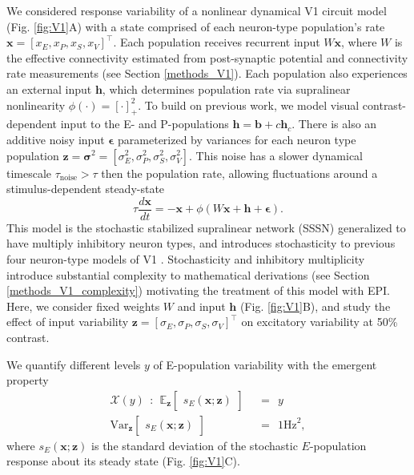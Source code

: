 \documentclass[11pt]{article}
\begin{document}
We considered response variability of a nonlinear dynamical V1 circuit model (Fig. \ref{fig:V1}A) with a state comprised of each neuron-type population's rate $\mathbf{x} = \left[x_E, x_P , x_S, x_V \right]^\top$.
Each population receives recurrent input $W \mathbf{x}$, where $W$ is the effective connectivity estimated from post-synaptic potential and connectivity rate measurements (see Section \ref{methods_V1}).
Each population also experiences an external input $\mathbf{h}$, which determines population rate via supralinear nonlinearity $\phi(\cdot) = \left[\cdot \right]^2_+$.
To build on previous work, we model visual contrast-dependent input to the E- and P-populations $\mathbf{h} = \mathbf{b} + c\mathbf{h}_c$.
There is also an additive noisy input $\bm{\epsilon}$ parameterized by variances for each neuron type population $\mathbf{z} = \bm{\sigma}^2 = \left[ \sigma_E^2, \sigma_P^2, \sigma_S^2, \sigma_V^2\right]$.
This noise has a slower dynamical timescale $\tau_{\text{noise}} > \tau$ then the population rate, allowing fluctuations around a stimulus-dependent steady-state
\begin{equation}
    \tau \frac{d\mathbf{x}}{dt} = -\mathbf{x} +\phi(W\mathbf{x} + \mathbf{h} + \bm{\epsilon}).
\end{equation}
This model is the stochastic stabilized supralinear network (SSSN) \cite{hennequin2018dynamical} generalized to have multiply inhibitory neuron types, and introduces stochasticity to previous four neuron-type models of V1 \cite{litwin2016inhibitory}.
Stochasticity and inhibitory multiplicity introduce substantial complexity to mathematical derivations (see Section \ref{methods_V1_complexity}) motivating the treatment of this model with EPI.
Here, we consider fixed weights $W$ and input $\mathbf{h}$ \cite{palmigiano2020structure} (Fig. \ref{fig:V1}B), and study the effect of input variability $\mathbf{z} = [\sigma_E, \sigma_P, \sigma_S, \sigma_V]^\top$ on excitatory variability at 50\% contrast. 

We quantify different levels $y$ of E-population variability with the emergent property
\begin{equation}\label{eq:EP_V1}
\begin{split}
\mathcal{X}(y) ~~:~~  \mathbb{E}_{\mathbf{z}}\begin{bmatrix} s_E(\mathbf{x}; \mathbf{z}) \end{bmatrix}  &~~=~~ y \\ 
 \text{Var}_{\mathbf{z}}\begin{bmatrix} s_E(\mathbf{x}; \mathbf{z}) \end{bmatrix}  &~~=~~  1 \text{Hz}^2,
\end{split}
\end{equation}
where $s_E(\mathbf{x}; \mathbf{z})$ is the standard deviation of the stochastic $E$-population response about its steady state (Fig. \ref{fig:V1}C).
\end{document}
